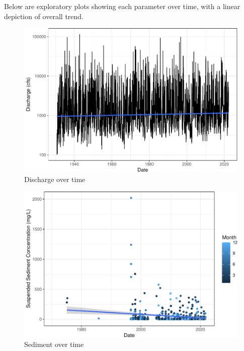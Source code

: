 \documentclass[
  12pt,
]{article}
\begin{document}
Below are exploratory plots showing each parameter over time, with a
linear depiction of overall trend.

\begin{figure}
\centering
\includegraphics{Project_Template_files/figure-latex/exploration_plot1-1.pdf}
\caption{Discharge over time}
\end{figure}

\begin{figure}
\centering
\includegraphics{Project_Template_files/figure-latex/exploration_plot2-1.pdf}
\caption{Sediment over time}
\end{figure}
\end{document}
